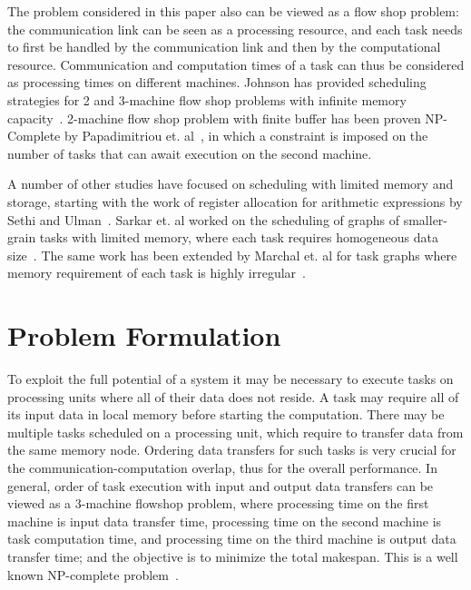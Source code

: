 \documentclass[sigconf]{acmart}
\begin{document}
	The problem considered in this paper also can be viewed as a flow shop problem: the communication link can be seen as a processing resource, and each task needs to first be handled by the communication link and then by the computational resource. Communication and computation times of a task can thus be considered as processing times on different machines. Johnson has provided scheduling strategies for 2 and 3-machine flow shop problems with infinite memory capacity~\cite{johnson}. 2-machine flow shop problem with finite buffer has been proven NP-Complete by Papadimitriou et. al~\cite{Papadimitriou:1980:FSL:322203.322213}, in which a constraint is imposed on the number of tasks that can await execution on the second machine.
	
	A number of other studies have focused on scheduling with limited memory and storage, starting with the work of register allocation for arithmetic expressions by Sethi and Ulman~\cite{Sethi:1970:GOC:321607.321620}. Sarkar et. al worked on the scheduling of graphs of smaller-grain tasks with limited memory, where each task requires homogeneous data size~\cite{vsarkar-pact}. The same work has been extended by Marchal et. al for task graphs where memory requirement of each task is highly irregular~\cite{loris-ipdps18}.
	
	
	
	\section{Problem Formulation}
	\label{sec:theoreticalProof}
	
	To exploit the full potential of a system it may be necessary to execute tasks on processing
	units where all of their data does not reside. A task may require all of its input data
	in local memory before starting the computation. There may be multiple tasks
	scheduled on a processing unit, which require to transfer data from the same
	memory node. Ordering data transfers for such tasks is very crucial for the
	communication-computation overlap, thus for the overall
	performance. In general, order of task execution with input
	and output data transfers can be  
	viewed as a 3-machine flowshop problem, where processing time on the first machine is 
	input data transfer time, processing time on the second machine is task computation time, 
	and processing time on the third machine is output data transfer time; and the objective is 
	to minimize the total makespan. This is a well known NP-complete problem~\cite{3machineFlowShopNPComplete}.
	
\end{document}
